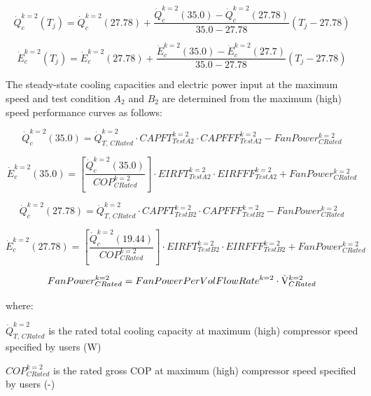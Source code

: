 \begin{equation}
\dot Q_c^{k = 2}({T_j}) = \dot Q_c^{k = 2}(27.78) + \frac{{\dot Q_c^{k = 2}(35.0) - \dot Q_c^{k = 2}(27.78)}}{{35.0 - 27.78}}\left( {{T_j} - 27.78} \right)
\end{equation}

\begin{equation}
\dot E_c^{k = 2}({T_j}) = \dot E_c^{k = 2}(27.78) + \frac{{\dot E_c^{k = 2}(35.0) - \dot E_c^{k = 2}(27.7)}}{{35.0 - 27.78}}\left( {{T_j} - 27.78} \right)
\end{equation}

The steady-state cooling capacities and electric power input at the maximum speed and test condition \(A_{2}\) and \(B_{2}\) are determined from the maximum (high) speed performance curves as follows:

\begin{equation}
\dot Q_c^{k = 2}(35.0) = \dot Q_{T,\,CRated}^{k = 2} \cdot CAPFT_{TestA2}^{k = 2} \cdot CAPFFF_{TestA2}^{k = 2} - FanPower_{CRated}^{k = 2}
\end{equation}

\begin{equation}
\dot E_c^{k = 2}(35.0) = \left[ {\frac{{\dot Q_c^{k = 2}(35.0)}}{{COP_{CRated}^{k = 2}}}} \right] \cdot EIRFT_{TestA2}^{k = 2} \cdot EIRFFF_{TestA2}^{k = 2} + FanPower_{CRated}^{k = 2}
\end{equation}

\begin{equation}
  \dot Q_c^{k = 2}(27.78) = \dot Q_{T,\,CRated}^{k = 2} \cdot CAPFT_{TestB2}^{k = 2} \cdot CAPFFF_{TestB2}^{k = 2} - FanPower_{CRated}^{k = 2}
\end{equation}

\begin{equation}
  \dot E_c^{k = 2}(27.78) = \left[ {\frac{{\dot Q_c^{k = 2}(19.44)}}{{COP_{CRated}^{k = 2}}}} \right] \cdot EIRFT_{TestB2}^{k = 2} \cdot EIRFFF_{TestB2}^{k = 2} + FanPower_{CRated}^{k = 2}
\end{equation}

\begin{equation}
  FanPower_{CRated}^{k = 2} = FanPowerPerVolFlowRat{e^{k = 2}} \cdot {\rm{\dot V}}_{CRated}^{k = 2}
\end{equation}

where:

\(\dot Q_{T,\,CRated}^{k = 2}\) is the rated total cooling capacity at maximum (high) compressor speed specified by users (W)

\(COP_{CRated}^{k = 2}\) is the rated gross COP at maximum (high) compressor speed specified by users (-)

